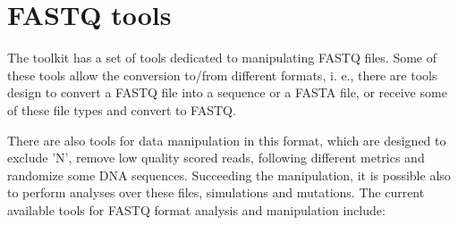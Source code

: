 \chapter{FASTQ tools}
\label{fastq}
The toolkit has a set of tools dedicated to manipulating FASTQ files. Some of these tools allow the conversion to/from different formats, i. e., there are tools design to convert a FASTQ file into a sequence or a FASTA file, or receive some of these file types and convert to FASTQ.

There are also tools for data manipulation in this format, which are designed to exclude 'N', remove low quality scored reads, following different metrics and randomize some DNA sequences. Succeeding the manipulation, it is possible also to perform analyses over these files, simulations and mutations. The current available tools for FASTQ format analysis and manipulation include:
